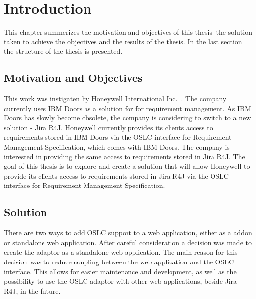 
% 

\chapter{Introduction}
This chapter summerizes the motivation and objectives of this thesis, the solution taken to achieve the objectives and the results of the thesis. In the last section the structure of the thesis is presented.

\section{Motivation and Objectives}
This work was instigaten by Honeywell International Inc. \cite{honeywell}. The company currently uses IBM Doors as a solution for for requirement management. As IBM Doors has slowly become obsolete, the company is considering to switch to a new solution - Jira R4J. Honeywell currently provides its clients access to requirements stored in IBM Doors via the OSLC interface for Requirement Management Specification, which comes with IBM Doors. The company is interested in providing the same access to requirements stored in Jira R4J. The goal of this thesis is to explore and create a solution that will allow Honeywell to provide its clients access to requirements stored in Jira R4J via the OSLC interface for Requirement Management Specification.

\section{Solution}
There are two ways to add OSLC support to a web application, either as a addon or standalone web application. After careful consideration a decision was made to create the adaptor as a standalone web application. The main reason for this decision was to reduce coupling between the web application and the OSLC interface. This allows for easier maintenance and development, as well as the possibility to use the OSLC adaptor with other web applications, beside Jira R4J, in the future. 

